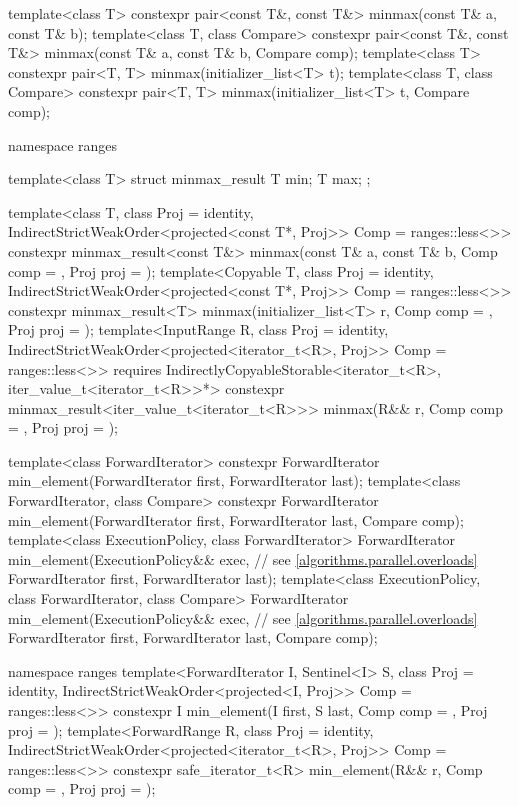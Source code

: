 \begin{codeblock}
{  template<class T> constexpr pair<const T&, const T&> minmax(const T& a, const T& b);
  template<class T, class Compare>
    constexpr pair<const T&, const T&> minmax(const T& a, const T& b, Compare comp);
  template<class T>
    constexpr pair<T, T> minmax(initializer_list<T> t);
  template<class T, class Compare>
    constexpr pair<T, T> minmax(initializer_list<T> t, Compare comp);

  namespace ranges {
    template<class T>
    struct minmax_result {
      T min;
      T max;
    };

    template<class T, class Proj = identity,
        IndirectStrictWeakOrder<projected<const T*, Proj>> Comp = ranges::less<>>
      constexpr minmax_result<const T&>
        minmax(const T& a, const T& b, Comp comp = {}, Proj proj = {});
    template<Copyable T, class Proj = identity,
        IndirectStrictWeakOrder<projected<const T*, Proj>> Comp = ranges::less<>>
      constexpr minmax_result<T>
        minmax(initializer_list<T> r, Comp comp = {}, Proj proj = {});
    template<InputRange R, class Proj = identity,
        IndirectStrictWeakOrder<projected<iterator_t<R>, Proj>> Comp = ranges::less<>>
      requires IndirectlyCopyableStorable<iterator_t<R>, iter_value_t<iterator_t<R>>*>
      constexpr minmax_result<iter_value_t<iterator_t<R>>>
        minmax(R&& r, Comp comp = {}, Proj proj = {});
  }

  template<class ForwardIterator>
    constexpr ForwardIterator min_element(ForwardIterator first, ForwardIterator last);
  template<class ForwardIterator, class Compare>
    constexpr ForwardIterator min_element(ForwardIterator first, ForwardIterator last,
                                          Compare comp);
  template<class ExecutionPolicy, class ForwardIterator>
    ForwardIterator min_element(ExecutionPolicy&& exec, // see \ref{algorithms.parallel.overloads}
                                ForwardIterator first, ForwardIterator last);
  template<class ExecutionPolicy, class ForwardIterator, class Compare>
    ForwardIterator min_element(ExecutionPolicy&& exec, // see \ref{algorithms.parallel.overloads}
                                ForwardIterator first, ForwardIterator last,
                                Compare comp);

  namespace ranges {
    template<ForwardIterator I, Sentinel<I> S, class Proj = identity,
        IndirectStrictWeakOrder<projected<I, Proj>> Comp = ranges::less<>>
      constexpr I min_element(I first, S last, Comp comp = {}, Proj proj = {});
    template<ForwardRange R, class Proj = identity,
        IndirectStrictWeakOrder<projected<iterator_t<R>, Proj>> Comp = ranges::less<>>
      constexpr safe_iterator_t<R>
        min_element(R&& r, Comp comp = {}, Proj proj = {});
  }

}
\end{codeblock}
